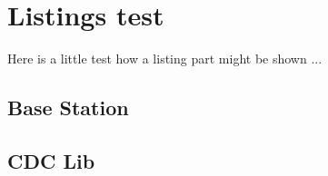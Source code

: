 \chapter{Listings test}

Here is a little test how a listing part might be shown ...

%
\newpage

\section{Base Station}


\newpage


\newpage


\newpage


\newpage


\newpage

\section{CDC Lib}


\newpage


\newpage




